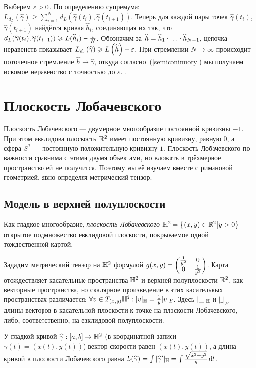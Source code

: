 \documentclass[a4paper]{report}
\begin{document}
{{{    Выберем $\varepsilon > 0$. По определению супремума: $L_{d_L}(\hat{\gamma}) \ge \sum\limits_{i = 1}^{N}d_L(\hat{\gamma}(t_i), \hat{\gamma}(t_{i+1}))$.
    Теперь для каждой пары точек $\hat{\gamma}(t_i)$, $\hat{\gamma}(t_{i+1})$ найдётся кривая $\hat{h}_i$, соединяющая их так, что $d_L(\widehat{\gamma}(t_i), \widehat{\gamma}(t_{i+1})) \geqslant L(\widehat{h}_i) - \frac{\varepsilon}{N}$.
    Обозначим за $\widehat{h} = \widehat{h}_1 \cdot\ldots\cdot \widehat{h}_{N-1}$, цепочка неравенств показывает $L_{d_L}(\widehat{\gamma}) \geqslant L\left(\widehat{h}\right) - \varepsilon$.
    При стремлении $N \to \infty$ происходит поточечное стремление $\hat{h} \to \hat{\gamma}$, откуда согласно~(\cref{semiconinuoty}) мы получаем искомое неравенство с точностью до $\varepsilon$.
        . %
    }
    }
    }
    \section{Плоскость Лобачевского}
    Плоскость Лобачевского --- двумерное многообразие постоянной кривизны $-1$.
    При этом евклидова плоскость $\mathbb{R}^2$ имеет постоянную кривизну, равную $0$, а сфера $S^2$ --- постоянную положительную кривизну $1$.
    Плоскость Лобачевского по важности сравнима с этими двумя объектами, но вложить в трёхмерное пространство ей не получится.
    Поэтому мы её изучаем вместе с римановой геометрией, явно определяя метрический тензор.
    \subsection{Модель в верхней полуплоскости}
    Как гладкое многообразие, \emph{плоскость Лобачевского} $\mathbb{H}^2 = \left\{(x, y) \in \mathbb{R}^2\middle|y > 0\right\}$ --- открытое подмножество евклидовой плоскости, покрываемое одной тождественной картой.

    Зададим метрический тензор на $\mathbb{H}^2$ формулой $g(x, y) = \begin{pmatrix}\frac{1}{y^2} & 0 \\ 0 & \frac{1}{y^2}\end{pmatrix}$.
    Карта отождествляет касательные пространства $\mathbb{H}^2$ и верхней полуплоскости $\mathbb{R}^2$, как векторные пространства, но скалярное произведение в этих касательных пространствах различается: $\forall v \in T_{(x, y)}\mathbb{H}^2: |v|_{\mathbb{H}} = \frac{1}{y}|v|_{E}$.
    Здесь $|\_|_{\mathbb{H}}$ и $|\_|_{E}$ --- длины векторов в касательной плоскости к точке на плоскости Лобачевского, либо, соответственно, на евклидовой полуплоскости.

    У гладкой кривой $\widehat{\gamma}: [a, b] \rightarrow \mathbb{H}^2$ (в координатной записи $\gamma(t) = (x(t), y(t))$) вектор скорости равен $(\dot{x}(t), \dot{y}(t))$, а длина кривой в плоскости Лобачевского равна $L(\widehat{\gamma}) = \int|\widehat{\gamma}'|_{\mathbb{H}} = \int\frac{\sqrt{\dot{x}^2 + \dot{y}^2}}{y}\operatorname{d}\! t$.
\end{document}
